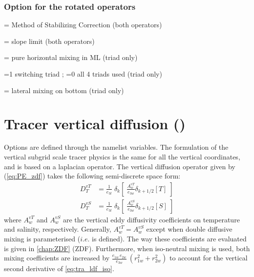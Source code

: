 \documentclass[../tex_main/NEMO_manual]{subfiles}
\begin{document}
\subsubsection{Option for the rotated operators}
\label{subsec:TRA_ldf_options}

 = Method of Stabilizing Correction (both operators)

 = slope limit (both operators)

 = pure horizontal mixing in ML (triad only)

 =1 switching triad ; =0 all 4 triads used (triad only) 

 = lateral mixing on bottom (triad only)

\section{Tracer vertical diffusion (\protect{})}
\label{sec:TRA_zdf}

Options are defined through the  namelist variables.
The formulation of the vertical subgrid scale tracer physics is the same 
for all the vertical coordinates, and is based on a laplacian operator. 
The vertical diffusion operator given by (\autoref{eq:PE_zdf}) takes the 
following semi-discrete space form:
\begin{equation} \label{eq:tra_zdf}
\begin{split}
D^{vT}_T &= \frac{1}{e_{3t}} \; \delta_k \left[ \;\frac{A^{vT}_w}{e_{3w}}  \delta_{k+1/2}[T] \;\right] 
\\
D^{vS}_T &= \frac{1}{e_{3t}} \; \delta_k \left[ \;\frac{A^{vS}_w}{e_{3w}}  \delta_{k+1/2}[S] \;\right] 
\end{split}
\end{equation}
where $A_w^{vT}$ and $A_w^{vS}$ are the vertical eddy diffusivity 
coefficients on temperature and salinity, respectively. Generally, 
$A_w^{vT}=A_w^{vS}$ except when double diffusive mixing is 
parameterised ($i.e.$  is defined). The way these coefficients 
are evaluated is given in \autoref{chap:ZDF} (ZDF). Furthermore, when 
iso-neutral mixing is used, both mixing coefficients are increased 
by $\frac{e_{1w}\,e_{2w} }{e_{3w} }\ \left( {r_{1w} ^2+r_{2w} ^2} \right)$ 
to account for the vertical second derivative of \autoref{eq:tra_ldf_iso}. 
\end{document}
